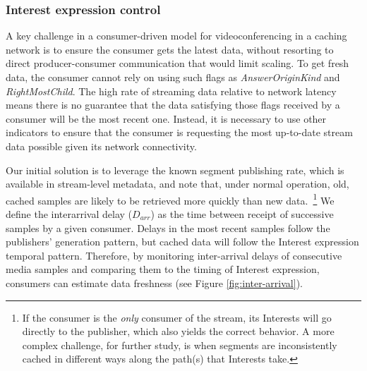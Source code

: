 \documentclass{icn/sig-alternate-2012} %
\begin{document}
\subsubsection{Interest expression control}



A key challenge in a consumer-driven model for videoconferencing in a caching network is to ensure the consumer gets the latest data, without resorting to direct producer-consumer communication that would limit scaling. To get fresh data, the consumer cannot rely on using such flags as \textit{AnswerOriginKind} and \textit{RightMostChild}. The high rate of streaming data relative to network latency means there is no guarantee that the data satisfying those flags received by a consumer will be the most recent one. Instead, it is necessary to use other indicators to ensure that the consumer is requesting the most up-to-date stream data possible given its network connectivity. 

Our initial solution is to leverage the known segment publishing rate, which is available in stream-level metadata, and note that, under normal operation, old, cached samples are likely to be retrieved more quickly than new data.~\footnote{If the consumer is the \emph{only} consumer of the stream, its Interests will go directly to the publisher, which also yields the correct behavior. A more complex challenge, for further study, is when segments are inconsistently cached in different ways along the path(s) that Interests take.} We define the interarrival delay ($D_{arr}$) as the time between receipt of successive samples by a given consumer. Delays in the most recent samples follow the publishers' generation pattern, but cached data will follow the Interest expression temporal pattern. Therefore, by monitoring inter-arrival delays of consecutive media samples and comparing them to the timing of Interest expression, consumers can estimate data freshness (see Figure \ref{fig:inter-arrival}).

\end{document}
